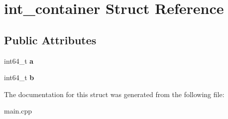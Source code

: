 \hypertarget{structint__container}{}\section{int\+\_\+container Struct Reference}
\label{structint__container}
\subsection*{Public Attributes}
\begin{DoxyCompactItemize}
\item 
\hypertarget{structint__container_a8bc1b0e8ac42abc46d88004d7004e989}{}int64\+\_\+t {\bfseries a}\label{structint__container_a8bc1b0e8ac42abc46d88004d7004e989}

\item 
\hypertarget{structint__container_a31f640d6f13abb7044e85a811fd3d340}{}int64\+\_\+t {\bfseries b}\label{structint__container_a31f640d6f13abb7044e85a811fd3d340}

\end{DoxyCompactItemize}


The documentation for this struct was generated from the following file\+:\begin{DoxyCompactItemize}
\item 
main.\+cpp\end{DoxyCompactItemize}
